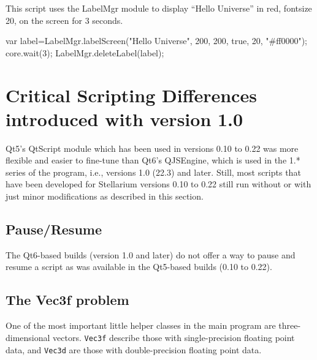 \noindent This script uses the LabelMgr module to display ``Hello Universe'' in red, fontsize 20, on the screen for 3 seconds.
\begin{script}
var label=LabelMgr.labelScreen("Hello Universe", 200, 200, 
                               true, 20, "#ff0000");
core.wait(3);
LabelMgr.deleteLabel(label);
\end{script}

\section{Critical Scripting Differences introduced with version 1.0}
\label{sec:scripting:differences}

Qt5's QtScript module which has been used in versions 0.10 to 0.22 was more flexible and easier to fine-tune than Qt6's QJSEngine, 
which is used in the 1.* series of the program, i.e., versions 1.0 (22.3) and later. 
Still, most scripts that have been developed for Stellarium versions 0.10 to 0.22 
still run without or with just minor modifications as described in this section. 

\subsection{Pause/Resume}
\label{sec:scripting:differences:pause}

The Qt6-based builds (version 1.0 and later) do not offer a way to pause and resume a script as was available in the Qt5-based builds (0.10 to 0.22). 

\subsection{The Vec3f problem}
\label{sec:scripting:differences:Vec3f}

One of the most important little helper classes in the main program are three-dimensional vectors. 
\texttt{Vec3f} describe those with single-precision floating point data, 
and \texttt{Vec3d} are those with double-precision floating point data.

